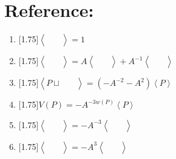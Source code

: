 \documentclass[14pt]{extarticle}
\newcommand{\LP}{\left(}
\newcommand{\RP}{\right)}
\newcommand{\LA}{\left\langle}
\newcommand{\RA}{\right\rangle}
\newcommand{\img}[1]{\begin{aligned}
    &\ \\
    &\\
    &\
\end{aligned}}
\begin{document}
\section*{Reference:}
\begin{enumerate}
        \item{ \scalebox{1.75}[1.75]{${\LA \img{unknot.svg} \RA=1}$}\vspace{-2.5cm}}
        \item{ \scalebox{1.75}[1.75]{$\LA \img{crossing_un.svg}\RA=A\LA \img{6a.svg} \RA+A^{-1}\LA\img{6b.svg}\RA$}\vspace{-2cm}}
        \item{ \scalebox{1.75}[1.75]{${\LA  P \sqcup \img{unknot.svg} \RA=\LP-A^{-2}-A^2\RP\LA  P\RA}$}\vspace{-1cm}}
        \item{ \scalebox{1.75}[1.75]{$V\LP P\RP=-A^{-3w\LP  P\RP}\LA  P\RA$}\vspace{-.5cm}}
        \item{ \scalebox{1.75}[1.75]{$\LA\img{t1.svg}\RA=-A^{-3}\LA\img{t1_2.svg}\RA$}\vspace{-2cm}}
        \item{ \scalebox{1.75}[1.75]{$\LA\img{t1_l.svg}\RA=-A^{3}\LA\img{t1_2.svg}\RA$}}
\end{enumerate}
\end{document}
